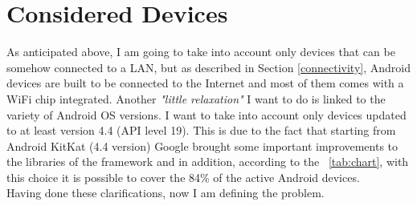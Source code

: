 \section{Considered Devices}
As anticipated above, I am going to take into account only devices that can be somehow connected to a LAN, but as described in Section \ref{connectivity}, Android devices are built to be connected to the Internet and most of them comes with a WiFi chip integrated. Another \textit{"little relaxation"} I want to do is linked to the variety of Android OS versions. I want to take into account only devices updated to at least version 4.4 (API level 19). This is due to the fact that starting from Android KitKat (4.4 version) Google brought some important improvements  to the libraries of the framework and in addition, according to the \tablename~\ref{tab:chart}, with this choice it is possible to cover the 84\% of the active Android devices.\\
Having done these clarifications, now I am defining the problem.


